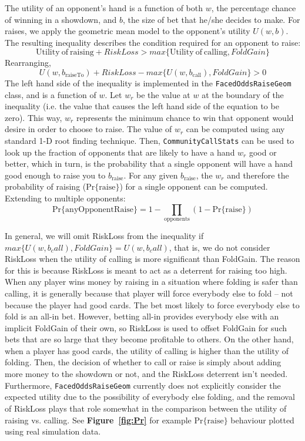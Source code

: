 The utility of an opponent's hand is a function of both $w$, the percentage chance of winning in a showdown, and $b$, the size of bet that he/she decides to make.
For raises, we apply the geometric mean model to the opponent's utility $U(w,b)$.
The resulting inequality describes the condition required for an opponent to raise:
\[
\mathrm{Utility\:of\:raising} + RiskLoss > max\{\mathrm{Utility\:of\:calling}, FoldGain\}
\]
Rearranging,
\[
U(w,b_{\mathrm{raiseTo}}) + RiskLoss - max\{U(w,b_{\mathrm{call}}), FoldGain\} > 0
\]
The left hand side of the inequality is implemented in the \texttt{FacedOddsRaiseGeom} class, and is a function of $w$.
Let $w_r$ be the value at $w$ at the boundary of the inequality (i.e. the value that causes the left hand side of the equation to be zero).
This way, $w_r$ represents the minimum chance to win that opponent would desire in order to choose to raise.
The value of $w_r$ can be computed using any standard 1-D root finding technique.
Then, \texttt{CommunityCallStats} can be used to look up the fraction of opponents that are likely to have a hand $w_r$ good or better, which in turn, is the probability that a single opponent will have a hand good enough to raise you to $b_{\mathrm{raise}}$.
For any given $b_{\mathrm{raise}}$, the $w_r$ and therefore the probability of raising ($\mathrm{Pr\{raise\}}$) for a single opponent can be computed.
Extending to multiple opponents:
\[
\mathrm{Pr\{anyOpponentRaise\}} = 1 - \prod_{\mathrm{opponents}} \left( 1 - \mathrm{Pr\{raise\}} \right)
\]


In general, we will omit RiskLoss from the inequality if $max\{U(w,b_call), FoldGain\} = U(w,b_call)$, that is, we do not consider RiskLoss when the utility of calling is more significant than FoldGain.
The reason for this is because RiskLoss is meant to act as a deterrent for raising too high.
When any player wins money by raising in a situation where folding is safer than calling, it is generally because that player will force everybody else to fold -- not because the player had good cards.
The bet most likely to force everybody else to fold is an all-in bet.
However, betting all-in provides everybody else with an implicit FoldGain of their own, so RiskLoss is used to offset FoldGain for such bets that are so large that they become profitable to others.
On the other hand, when a player has good cards, the utility of calling is higher than the utility of folding.
Then, the decision of whether to call or raise is simply about adding more money to the showdown or not, and the RiskLoss deterrent isn't needed.
Furthermore, \texttt{FacedOddsRaiseGeom} currently does not explicitly consider the expected utility due to the possibility of everybody else folding, and the removal of RiskLoss plays that role somewhat in the comparison between the utility of raising vs. calling.
See \textbf{Figure~\ref{fig:Pr}} for example $\mathrm{Pr\{raise\}}$ behaviour plotted using real simulation data.

